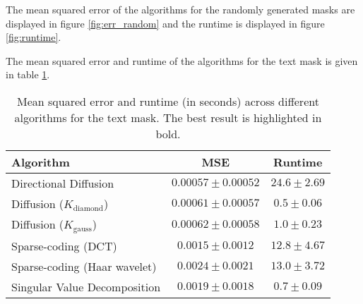 The mean squared error of the algorithms for the randomly generated masks are displayed in figure \ref{fig:err_random} and the runtime is displayed in figure \ref{fig:runtime}.

The mean squared error and runtime of the algorithms for the text mask is given in table \ref{tbl:err_text}.



\begin{table}
	\centering
	\begin{tabular}{|l|c|c|}
		\hline
		\textbf{Algorithm} & \textbf{MSE} & \textbf{Runtime} \\ \hline \hline
		Directional Diffusion & $\mathbf{0.00057} \pm 0.00052$ & $24.6 \pm 2.69$ \\ \hline
		Diffusion ($K_{\text{diamond}}$) & $0.00061 \pm 0.00057$ & $\mathbf{0.5} \pm 0.06$ \\ \hline
		Diffusion ($K_{\text{gauss}}$) & $0.00062 \pm 0.00058$ & $1.0 \pm 0.23$ \\ \hline
		Sparse-coding (DCT) & $0.0015 \pm 0.0012$ & $12.8 \pm 4.67$ \\ \hline
		Sparse-coding (Haar wavelet) & $0.0024 \pm 0.0021$ & $13.0 \pm 3.72$ \\ \hline
		Singular Value Decomposition & $0.0019 \pm 0.0018$ & $0.7 \pm 0.09$ \\ \hline
	\end{tabular}
	\caption{Mean squared error and runtime (in seconds) across different algorithms for the text mask. The best result is highlighted in bold.}
	\label{tbl:err_text}
\end{table}

